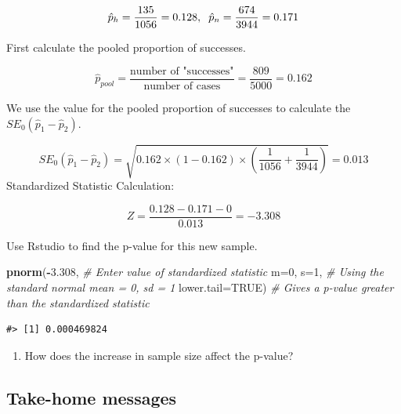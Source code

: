 \documentclass[
]{report}
\newenvironment{Shaded}{\begin{snugshade}}{\end{snugshade}}
\newcommand{\AttributeTok}[1]{\textcolor[rgb]{0.13,0.29,0.53}{#1}}
\newcommand{\CommentTok}[1]{\textcolor[rgb]{0.56,0.35,0.01}{\textit{#1}}}
\newcommand{\ConstantTok}[1]{\textcolor[rgb]{0.56,0.35,0.01}{#1}}
\newcommand{\DecValTok}[1]{\textcolor[rgb]{0.00,0.00,0.81}{#1}}
\newcommand{\FloatTok}[1]{\textcolor[rgb]{0.00,0.00,0.81}{#1}}
\newcommand{\FunctionTok}[1]{\textcolor[rgb]{0.13,0.29,0.53}{\textbf{#1}}}
\newcommand{\NormalTok}[1]{#1}
\newcommand{\SpecialCharTok}[1]{\textcolor[rgb]{0.81,0.36,0.00}{\textbf{#1}}}
\providecommand{\tightlist}{%
  \setlength{\itemsep}{0pt}\setlength{\parskip}{0pt}}
\begin{document}
\[\hat{p}_h = \frac{135}{1056}=0.128, \hspace{2mm} \hat{p}_n = \frac{674}{3944}=0.171\]

First calculate the pooled proportion of successes.

\[\hat{p}_{pool} = \frac{\text{number of "successes"}}{\text{number of cases}} = \frac{809}{5000} = 0.162\]

We use the value for the pooled proportion of successes to calculate the \(SE_0(\hat{p}_1 - \hat{p}_2)\).

\[
SE_0(\hat{p}_1-\hat{p}_2)=\sqrt{0.162 \times (1-0.162)\times \left(\frac{1}{1056}+\frac{1}{3944}\right)} = 0.013
\]
Standardized Statistic Calculation:

\[Z = \frac{0.128 - 0.171 - 0}{0.013} = -3.308\]

Use Rstudio to find the p-value for this new sample.

\begin{Shaded}
\begin{Highlighting}[]
\FunctionTok{pnorm}\NormalTok{(}\SpecialCharTok{{-}}\FloatTok{3.308}\NormalTok{, }\CommentTok{\# Enter value of standardized statistic}
      \AttributeTok{m=}\DecValTok{0}\NormalTok{, }\AttributeTok{s=}\DecValTok{1}\NormalTok{, }\CommentTok{\# Using the standard normal mean = 0, sd = 1}
      \AttributeTok{lower.tail=}\ConstantTok{TRUE}\NormalTok{) }\CommentTok{\# Gives a p{-}value greater than the standardized statistic}
\end{Highlighting}
\end{Shaded}

\begin{verbatim}
#> [1] 0.000469824
\end{verbatim}

\begin{enumerate}
\def\labelenumi{\arabic{enumi}.}
\setcounter{enumi}{9}
\tightlist
\item
  How does the increase in sample size affect the p-value?
\end{enumerate}

\vspace{0.4in}

\vspace{.8in}

\newpage

\subsection{Take-home messages}\label{take-home-messages-8}
\end{document}
